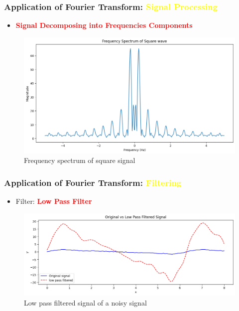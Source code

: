 \documentclass[aspectratio=1610]{beamer}
\begin{document}
  \begin{frame}
     \frametitle{Application of Fourier Transform: \textcolor{yellow}{Signal Processing}}
    \begin{itemize} [label=$\star$, itemsep=4pt, parsep=0pt, topsep=10pt]
        \item<1-> \textbf{\textcolor{red}{Signal Decomposing into Frequencies Components}}
    \end{itemize}
    \begin{figure}
        \centering
        \includegraphics[width=0.8\linewidth]{images/freqSpectrum.png}
        \caption{Frequency spectrum of square signal}
        \label{fig:enter-label}
    \end{figure}  
  \end{frame}
  
  \begin{frame}
    \frametitle{Application of Fourier Transform: \textcolor{yellow}{Filtering}}
    \begin{itemize} [label=$\star$, itemsep=4pt, parsep=0pt, topsep=10pt]
        \item<1-> Filter:  \textbf{\textcolor{red}{Low Pass Filter}}
    \end{itemize}
    \vspace{-10pt}
    \begin{figure}
        \centering
        \includegraphics[width=0.8\linewidth,height=0.5\linewidth]{images/lowPassFilter.png}
        \caption{Low pass filtered signal of a noisy signal}
        \label{fig:enter-label}
    \end{figure}
  \end{frame}
  
\end{document}
